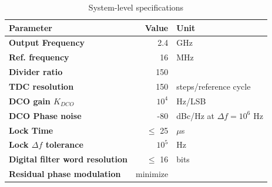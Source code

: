 \begin{table}[h!]
	\centering
	\def\arraystretch{1.5}		
	\setlength\arrayrulewidth{0.75pt}
	\setlength{\tabcolsep}{1em} %
	\begin{tabular}{|l|r|l|}
		\hline 
		\rule[-1ex]{0pt}{2.5ex} \cellcolor{gray!40}\textbf{Parameter} & \cellcolor{gray!40}\textbf{Value} & \cellcolor{gray!40}\textbf{Unit }\\ 
		\hline 
		\rule[-1ex]{0pt}{2.5ex} \textbf{Output Frequency}  & 2.4 & GHz \\ 
		\hline 
		\rule[-1ex]{0pt}{2.5ex} \textbf{Ref. frequency} & 16 & MHz\\ 
		\hline 
		\rule[-1ex]{0pt}{2.5ex} \textbf{Divider ratio} & 150  &\\ 
		\hline 
		\rule[-1ex]{0pt}{2.5ex} \textbf{TDC resolution} & 150  & steps/reference cycle\\ 
		\hline 
		\rule[-1ex]{0pt}{2.5ex} \textbf{DCO gain $K_{DCO}$} & $10^4$ & Hz/LSB \\ 
		\hline 
		\rule[-1ex]{0pt}{2.5ex} \textbf{DCO Phase noise} & -80 & dBc/Hz at $\Delta f=10^6$ Hz \\ 
		\hline 
		\rule[-1ex]{0pt}{2.5ex} \textbf{Lock Time} & $\leq$ 25 & $\mu$s \\ 
		\hline 
		\rule[-1ex]{0pt}{2.5ex} \textbf{Lock $\Delta f$ tolerance} & $10^5$ & Hz \\ 
		\hline 
		\rule[-1ex]{0pt}{2.5ex} \textbf{Digital filter word resolution} & $\leq$ 16 & bits \\ 
		\hline 
		\rule[-1ex]{0pt}{2.5ex} \textbf{Residual phase modulation} & minimize &  \\ 
		\hline 
	\end{tabular} 
	\caption{System-level specifications}
	\label{design_specs}
\end{table}   

